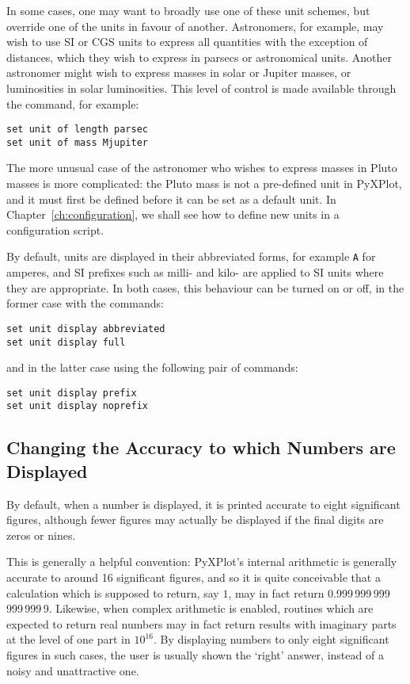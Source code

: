 In some cases, one may want to broadly use one of these unit schemes, but
override one of the units in favour of another.  Astronomers, for example, may
wish to use SI or CGS units to express all quantities with the exception of
distances, which they wish to express in parsecs or astronomical units. Another
astronomer might wish to express masses in solar or Jupiter masses, or
luminosities in solar luminosities. This level of control is made available
through the  command, for example:

\begin{verbatim}
set unit of length parsec
set unit of mass Mjupiter
\end{verbatim}

The more unusual case of the astronomer who wishes to express masses in Pluto
masses is more complicated: the Pluto mass is not a pre-defined unit in
PyXPlot, and it must first be defined before it can be set as a default unit.
In Chapter~\ref{ch:configuration}, we shall see how to define new units in a
configuration script.

By default, units are displayed in their abbreviated forms, for example {\tt A} for amperes, and SI prefixes such as milli- and kilo- are applied to SI units where they are appropriate. In both cases, this behaviour
can be turned on or off, in the former case with the commands:

\begin{verbatim}
set unit display abbreviated
set unit display full
\end{verbatim}

\noindent and in the latter case using the following pair of commands:

\begin{verbatim}
set unit display prefix
set unit display noprefix
\end{verbatim}

\subsection{Changing the Accuracy to which Numbers are Displayed}

By default, when a number is displayed, it is printed accurate to eight
significant figures, although fewer figures may actually be displayed if the
final digits are zeros or nines.

This is generally a helpful convention: PyXPlot's internal arithmetic is
generally accurate to around 16 significant figures, and so it is quite
conceivable that a calculation which is supposed to return, say $1$, may in
fact return 0.999\,999\,999\,999\,999\,9. Likewise, when complex arithmetic is
enabled, routines which are expected to return real numbers may in fact return
results with imaginary parts at the level of one part in $10^{16}$.  By
displaying numbers to only eight significant figures in such cases, the user is
usually shown the `right' answer, instead of a noisy and unattractive one.

